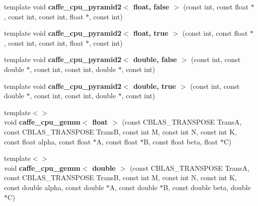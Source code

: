 \begin{DoxyCompactItemize}
\item 
template void {\bfseries caffe\+\_\+cpu\+\_\+pyramid2$<$ float, false $>$} (const int, const float $\ast$, const int, const int, float $\ast$, const int)\hypertarget{namespacecaffe_aa4fa4ea6724708af69117471a0d47abe}{}\label{namespacecaffe_aa4fa4ea6724708af69117471a0d47abe}

\item 
template void {\bfseries caffe\+\_\+cpu\+\_\+pyramid2$<$ float, true $>$} (const int, const float $\ast$, const int, const int, float $\ast$, const int)\hypertarget{namespacecaffe_a13c07192ab925de5ac19897c4a232f98}{}\label{namespacecaffe_a13c07192ab925de5ac19897c4a232f98}

\item 
template void {\bfseries caffe\+\_\+cpu\+\_\+pyramid2$<$ double, false $>$} (const int, const double $\ast$, const int, const int, double $\ast$, const int)\hypertarget{namespacecaffe_aa21b1ae8836fa4ab040286d1a9d48cb1}{}\label{namespacecaffe_aa21b1ae8836fa4ab040286d1a9d48cb1}

\item 
template void {\bfseries caffe\+\_\+cpu\+\_\+pyramid2$<$ double, true $>$} (const int, const double $\ast$, const int, const int, double $\ast$, const int)\hypertarget{namespacecaffe_ad0904018c92927c70ddae1b4bbc46493}{}\label{namespacecaffe_ad0904018c92927c70ddae1b4bbc46493}

\item 
{\footnotesize template$<$$>$ }\\void {\bfseries caffe\+\_\+cpu\+\_\+gemm$<$ float $>$} (const C\+B\+L\+A\+S\+\_\+\+T\+R\+A\+N\+S\+P\+O\+SE TransA, const C\+B\+L\+A\+S\+\_\+\+T\+R\+A\+N\+S\+P\+O\+SE TransB, const int M, const int N, const int K, const float alpha, const float $\ast$A, const float $\ast$B, const float beta, float $\ast$C)\hypertarget{namespacecaffe_af2b584d464ec95b349ba159204d58ba7}{}\label{namespacecaffe_af2b584d464ec95b349ba159204d58ba7}

\item 
{\footnotesize template$<$$>$ }\\void {\bfseries caffe\+\_\+cpu\+\_\+gemm$<$ double $>$} (const C\+B\+L\+A\+S\+\_\+\+T\+R\+A\+N\+S\+P\+O\+SE TransA, const C\+B\+L\+A\+S\+\_\+\+T\+R\+A\+N\+S\+P\+O\+SE TransB, const int M, const int N, const int K, const double alpha, const double $\ast$A, const double $\ast$B, const double beta, double $\ast$C)\hypertarget{namespacecaffe_aa83e160e90266206ce3baf458a21d884}{}\label{namespacecaffe_aa83e160e90266206ce3baf458a21d884}


\end{DoxyCompactItemize}
